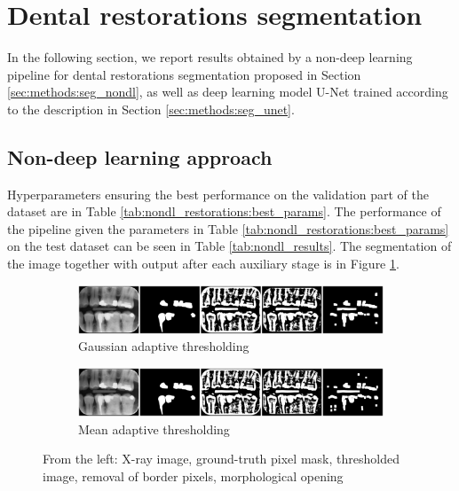 \section{Dental restorations segmentation}
In the following section, we report results obtained by a non-deep learning pipeline for dental restorations segmentation proposed in Section \ref{sec:methods:seg_nondl}, as well as deep learning model U-Net trained according to the description in Section \ref{sec:methods:seg_unet}.
\label{sec:dental_restoration_results}
\subsection{Non-deep learning approach}
Hyperparameters ensuring the best performance on the validation part of the dataset are in Table \ref{tab:nondl_restorations:best_params}. The performance of the pipeline given the parameters in Table \ref{tab:nondl_restorations:best_params} on the test dataset can be seen in Table \ref{tab:nondl_results}. The segmentation of the image together with output after each auxiliary stage is in Figure \ref{fig:segmentation_sample_nondl}.

\begin{figure}[h]
    \centering
    \begin{subfigure}[b]{\textwidth}
        \includegraphics[width=1\linewidth]{images/segmentation_nondl_gauss_12.pdf}
        \caption{Gaussian adaptive thresholding}
    \end{subfigure}

    \begin{subfigure}[b]{\textwidth}
        \includegraphics[width=1\linewidth]{images/segmentation_nondl_mean_12.pdf}
        \caption{Mean adaptive thresholding}
    \end{subfigure}
    \caption{From the left: X-ray image, ground-truth pixel mask, thresholded image, removal of border pixels, morphological opening}
    \label{fig:segmentation_sample_nondl}
\end{figure}

